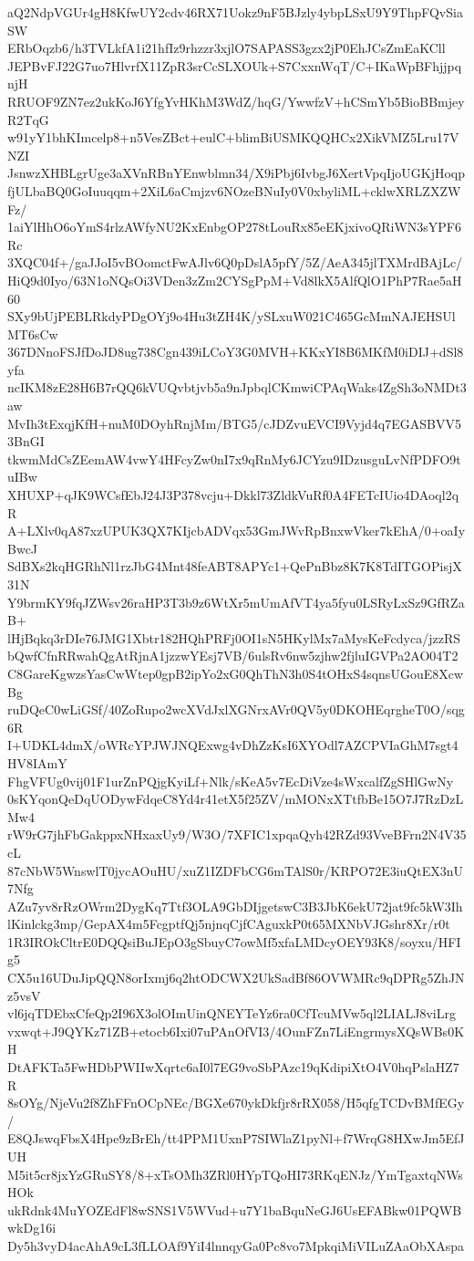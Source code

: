 aQ2NdpVGUr4gH8KfwUY2cdv46RX71Uokz9nF5BJzly4ybpLSxU9Y9ThpFQvSiaSW
ERbOqzb6/h3TVLkfA1i21hfIz9rhzzr3xjlO7SAPASS3gzx2jP0EhJCsZmEaKCll
JEPBvFJ22G7uo7HlvrfX11ZpR3srCcSLXOUk+S7CxxnWqT/C+IKaWpBFhjjpqnjH
RRUOF9ZN7ez2ukKoJ6YfgYvHKhM3WdZ/hqG/YwwfzV+hCSmYb5BioBBmjeyR2TqG
w91yY1bhKImcelp8+n5VesZBct+eulC+blimBiUSMKQQHCx2XikVMZ5Lru17VNZI
JsnwzXHBLgrUge3aXVnRBnYEnwblmn34/X9iPbj6IvbgJ6XertVpqIjoUGKjHoqp
fjULbaBQ0GoIuuqqm+2XiL6aCmjzv6NOzeBNuIy0V0xbyliML+cklwXRLZXZWFz/
1aiYlHhO6oYmS4rlzAWfyNU2KxEnbgOP278tLouRx85eEKjxivoQRiWN3sYPF6Rc
3XQC04f+/gaJJoI5vBOomctFwAJlv6Q0pDslA5pfY/5Z/AeA345jlTXMrdBAjLc/
HiQ9d0Iyo/63N1oNQsOi3VDen3zZm2CYSgPpM+Vd8lkX5AlfQlO1PhP7Rae5aH60
SXy9bUjPEBLRkdyPDgOYj9o4Hu3tZH4K/ySLxuW021C465GcMmNAJEHSUlMT6sCw
367DNnoFSJfDoJD8ug738Cgn439iLCoY3G0MVH+KKxYI8B6MKfM0iDIJ+dSl8yfa
ncIKM8zE28H6B7rQQ6kVUQvbtjvb5a9nJpbqlCKmwiCPAqWaks4ZgSh3oNMDt3aw
MvIh3tExqjKfH+nuM0DOyhRnjMm/BTG5/cJDZvuEVCI9Vyjd4q7EGASBVV53BnGI
tkwmMdCsZEemAW4vwY4HFcyZw0nI7x9qRnMy6JCYzu9IDzusguLvNfPDFO9tuIBw
XHUXP+qJK9WCsfEbJ24J3P378vcju+Dkkl73ZldkVuRf0A4FETcIUio4DAoql2qR
A+LXlv0qA87xzUPUK3QX7KIjcbADVqx53GmJWvRpBnxwVker7kEhA/0+oaIyBwcJ
SdBXs2kqHGRhNl1rzJbG4Mnt48feABT8APYc1+QePnBbz8K7K8TdITGOPisjX31N
Y9brmKY9fqJZWsv26raHP3T3b9z6WtXr5mUmAfVT4ya5fyu0LSRyLxSz9GfRZaB+
lHjBqkq3rDIe76JMG1Xbtr182HQhPRFj0OI1sN5HKylMx7aMysKeFcdyca/jzzRS
bQwfCfnRRwahQgAtRjnA1jzzwYEsj7VB/6ulsRv6nw5zjhw2fjluIGVPa2AO04T2
C8GareKgwzsYasCwWtep0gpB2ipYo2xG0QhThN3h0S4tOHxS4sqnsUGouE8XcwBg
ruDQeC0wLiGSf/40ZoRupo2wcXVdJxlXGNrxAVr0QV5y0DKOHEqrgheT0O/sqg6R
I+UDKL4dmX/oWRcYPJWJNQExwg4vDhZzKsI6XYOdl7AZCPVIaGhM7sgt4HV8IAmY
FhgVFUg0vij01F1urZnPQjgKyiLf+Nlk/sKeA5v7EcDiVze4sWxcalfZgSHlGwNy
0sKYqonQeDqUODywFdqeC8Yd4r41etX5f25ZV/mMONxXTtfbBe15O7J7RzDzLMw4
rW9rG7jhFbGakppxNHxaxUy9/W3O/7XFIC1xpqaQyh42RZd93VveBFrn2N4V35cL
87cNbW5WnswlT0jycAOuHU/xuZ1IZDFbCG6mTAlS0r/KRPO72E3iuQtEX3nU7Nfg
AZu7yv8rRzOWrm2DygKq7Ttf3OLA9GbDIjgetswC3B3JbK6ekU72jat9fc5kW3Ih
lKinlckg3mp/GepAX4m5FcgptfQj5njnqCjfCAguxkP0t65MXNbVJGshr8Xr/r0t
1R3IROkCltrE0DQQsiBuJEpO3gSbuyC7owMf5xfaLMDcyOEY93K8/soyxu/HFIg5
CX5u16UDuJipQQN8orIxmj6q2htODCWX2UkSadBf86OVWMRc9qDPRg5ZhJNz5vsV
vl6jqTDEbxCfeQp2I96X3olOImUinQNEYTeYz6ra0CfTcuMVw5ql2LIALJ8viLrg
vxwqt+J9QYKz71ZB+etocb6Ixi07uPAnOfVI3/4OunFZn7LiEngrmysXQsWBs0KH
DtAFKTa5FwHDbPWIIwXqrtc6aI0l7EG9voSbPAzc19qKdipiXtO4V0hqPslaHZ7R
8sOYg/NjeVu2f8ZhFFnOCpNEc/BGXe670ykDkfjr8rRX058/H5qfgTCDvBMfEGy/
E8QJswqFbsX4Hpe9zBrEh/tt4PPM1UxnP7SIWlaZ1pyNl+f7WrqG8HXwJm5EfJUH
M5it5cr8jxYzGRuSY8/8+xTsOMh3ZRl0HYpTQoHI73RKqENJz/YmTgaxtqNWsHOk
ukRdnk4MuYOZEdFl8wSNS1V5WVud+u7Y1baBquNeGJ6UsEFABkw01PQWBwkDg16i
Dy5h3vyD4acAhA9cL3fLLOAf9YiI4lnnqyGa0Pc8vo7MpkqiMiVILuZAaObXAspa
